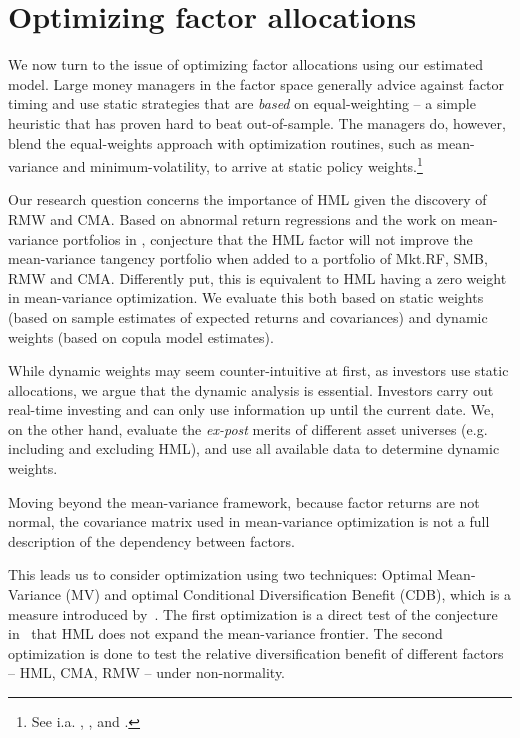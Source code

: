 
\section{Optimizing factor allocations} %
\label{sec:optimizing_factor_allocations}

We now turn to the issue of optimizing factor allocations using our estimated model. Large money managers in the factor space generally advice against factor timing and use static strategies that are \emph{based} on equal-weighting -- a simple heuristic that has proven hard to beat out-of-sample. The managers do, however, blend the equal-weights approach with optimization routines, such as mean-variance and minimum-volatility, to arrive at static policy weights.\footnote{See i.a. \textcite{AQRSiren}, \textcite{BlackRock}, \textcite{MSCI} and \textcite{Robeco}.}

Our research question concerns the importance of HML given the discovery of RMW and CMA. Based on abnormal return regressions and the work on mean-variance portfolios in \textcite{HubermanKandel1987}, \textcite{FF2015} conjecture that the HML factor will not improve the mean-variance tangency portfolio when added to a portfolio of Mkt.RF, SMB, RMW and CMA. Differently put, this is equivalent to HML having a zero weight in mean-variance optimization. We evaluate this both based on static weights (based on sample estimates of expected returns and covariances) and dynamic weights (based on copula model estimates).

While dynamic weights may seem counter-intuitive at first, as investors use static allocations, we argue that the dynamic analysis is essential. Investors carry out real-time investing and can only use information up until the current date. We, on the other hand, evaluate the \emph{ex-post} merits of different asset universes (e.g. including and excluding HML), and use all available data to determine dynamic weights.

Moving beyond the mean-variance framework, because factor returns are not normal, the covariance matrix used in mean-variance optimization is not a full description of the dependency between factors.

This leads us to consider optimization using two techniques: Optimal Mean-Variance (MV) and optimal Conditional Diversification Benefit (CDB), which is a measure introduced by~\textcite{ChristoffersenErrunzaJacobLanglois2012}. The first optimization is a direct test of the conjecture in~\textcite{FF2015} that HML does not expand the mean-variance frontier. The second optimization is done to test the relative diversification benefit of different factors -- HML, CMA, RMW -- under non-normality.

